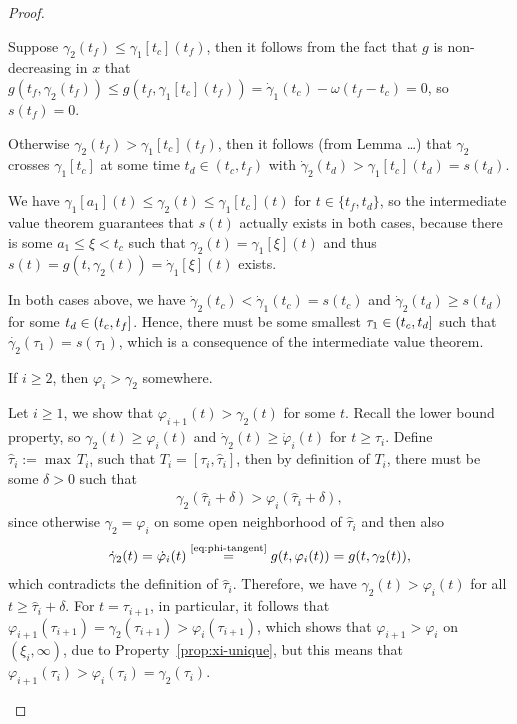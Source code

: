 \documentclass[a4paper]{article}
\theoremstyle{definition}
\theoremstyle{plain}
\begin{document}
\begin{proof}
\begin{outline}
  \2 Suppose $\gamma_{2}(t_{f}) \leq \gamma_{1}[t_{c}](t_{f})$, then it follows from the fact
  that $g$ is non-decreasing in $x$ that
  $g(t_{f}, \gamma_{2}(t_{f})) \leq g(t_{f}, \gamma_{1}[t_{c}](t_{f})) = \dot{\gamma}_{1}(t_{c}) - \omega(t_{f} - t_{c}) = 0$,
  so $s(t_{f}) = 0$.

  \2 Otherwise $\gamma_{2}(t_{f}) > \gamma_{1}[t_{c}](t_{f})$, then it follows
  (from Lemma \dots) that $\gamma_{2}$ crosses $\gamma_{1}[t_{c}]$ at some time
  $t_{d} \in (t_{c}, t_{f})$ with
  $\dot{\gamma}_{2}(t_{d}) > \gamma_{1}[t_{c}](t_{d}) = s(t_{d})$.

  \2 We have $\gamma_{1}[a_{1}](t) \leq \gamma_{2}(t) \leq \gamma_{1}[t_{c}](t)$ for
  $t \in \{ t_{f}, t_{d} \}$, so the intermediate value theorem guarantees that
  $s(t)$ actually exists in both cases, because there is some
  $a_{1} \leq \xi < t_{c}$ such that $\gamma_{2}(t) = \gamma_{1}[\xi](t)$ and thus
  $s(t) = g(t, \gamma_{2}(t)) = \dot{\gamma}_{1}[\xi](t)$ exists.

  \2 In both cases above, we have
  $\dot{\gamma}_{2}(t_{c}) < \dot{\gamma}_{1}(t_{c}) = s(t_{c})$ and
  $\dot{\gamma}_{2}(t_{d}) \geq s(t_{d})$ for some $t_{d} \in (t_{c},t_{f}]$.
  Hence, there must be some smallest $\tau_{1} \in (t_{c},t_{d}]$ such that
  $\dot{\gamma_{2}}(\tau_{1}) = s(\tau_{1})$, which is a consequence of the intermediate
  value theorem.

  \1 If $i \geq 2$, then $\varphi_{i} > \gamma_{2}$ somewhere.

  \2 Let $i \geq 1$, we show that $\varphi_{i+1}(t) > \gamma_{2}(t)$ for some $t$.
  Recall the lower bound property, so $\gamma_{2}(t) \geq \varphi_{i}(t)$ and
  $\dot{\gamma}_{2}(t) \geq \dot{\varphi}_{i}(t)$ for $t \geq \tau_{i}$.
  Define $\hat{\tau}_{i} := \max \, T_{i}$, such that
  $T_{i} = [\tau_{i}, \hat{\tau}_{i}]$, then by definition of $T_{i}$, there
  must be some $\delta > 0$ such that
  \begin{align}
    \gamma_{2}(\hat{\tau}_{i} + \delta) > \varphi_{i}(\hat{\tau}_{i} + \delta) ,
  \end{align}
  since otherwise $\gamma_{2} = \varphi_{i}$ on some open neighborhood of
  $\hat{\tau}_{i}$ and then also
  \begin{align}
    \dot{\gamma}_{2}(t) = \dot{\varphi}_{i}(t) \overset{\text{\eqref{eq:phi-tangent}}}{=} g(t, \varphi_{i}(t)) = g(t, \gamma_{2}(t)),
  \end{align}
  which contradicts the definition of $\hat{\tau}_{i}$.
  Therefore, we have $\gamma_{2}(t) > \varphi_{i}(t)$ for all $t \geq \hat{\tau}_{i} + \delta$. For
  $t = \tau_{i+1}$, in particular, it follows that
  $\varphi_{i+1}(\tau_{i+1}) = \gamma_{2}(\tau_{i+1}) > \varphi_{i}(\tau_{i+1})$, which shows that
  $\varphi_{i+1} > \varphi_{i}$ on $(\xi_{i}, \infty)$, due to Property~\ref{prop:xi-unique}, but this means that
  $\varphi_{i+1}(\tau_{i}) > \varphi_{i}(\tau_{i}) = \gamma_{2}(\tau_{i})$.


\end{outline}
\end{proof}
\end{document}
